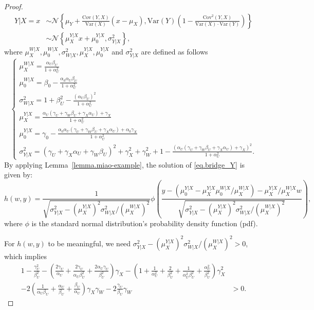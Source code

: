 \documentclass[10pt,a4paper]{amsart}
\def\cN{\mathcal{N}}
\begin{document}
\begin{proof}
$$\begin{aligned}
    Y|X=x&\sim \cN\left\{ \mu_Y+\frac{\mathrm{Cov}(Y,X)}{\mathrm{Var}(X)}(x-\mu_{X}),\mathrm{Var}(Y)\left( 1-\frac{\mathrm{Cov}^2(Y,X)}{\mathrm{Var}(X)\cdot \mathrm{Var}(Y)} \right) \right\}\nonumber \\
	&\sim \cN\left\{ \mu_{X}^{Y|X}x+\mu_{0}^{Y|X},\sigma_{Y|X}^{2} \right\},
\end{aligned}
$$
where $\mu_{X}^{W|X},\mu_{0}^{W|X},\sigma_{W|X}^{2}, \mu_{X}^{Y|X}, \mu_{0}^{Y|X}$ and $\sigma_{Y|X}^{2}$ are defined as follows
$$
\begin{cases}
	\mu_{X}^{W|X}=\frac{\alpha_U\beta_{U}}{1+\alpha_U^{2}}\\
	\mu_{0}^{W|X}=\beta_0-\frac{\alpha_0\alpha_U\beta_{U}}{1+\alpha_U^{2}}\\
	\sigma_{W|X}^{2}=1+\beta_{U}^{2}-\frac{(\alpha_U\beta_{U})^2}{1+\alpha_U^{2}}\\
	\mu_{X}^{Y|X}=\frac{\alpha_U\left( \gamma_{U}+\gamma_W\beta_{U}+\gamma_X\alpha_U \right) +\gamma_X}{1+\alpha_U^{2}}\\
	\mu_{0}^{Y|X}=\gamma_0-\frac{\alpha_0\alpha_U\left( \gamma_{U}+\gamma_W\beta_{U}+\gamma_X\alpha_U \right) +\alpha_0\gamma_X}{1+\alpha_U^{2}}\\
	\sigma_{Y|X}^{2}=(\gamma_{U}+\gamma_X\alpha_U+\gamma_W\beta_{U})^2+\gamma_X^{2}+\gamma_W^{2}+1-\frac{(\alpha_U\left( \gamma_{U}+\gamma_W\beta_{U}+\gamma_X\alpha_U \right) +\gamma_X)^2}{1+\alpha_U^{2}}.
\end{cases}
$$
By applying Lemma~\ref{lemma.miao-example}, the solution of \eqref{eq.bridge_Y} is given by:
$$
h(w,y)=\frac{1}{\sqrt{\sigma_{Y|X}^{2}-\left(\mu_{X}^{Y|X}\right)^2\sigma_{W|X}^{2}/\left(\mu_{X}^{W|X}\right)^2}}\phi \left( \frac{y-\left( \mu_{0}^{Y|X}-\mu_{X}^{Y|X}\mu_{0}^{W|X}/\mu_{X}^{W|X} \right) -\mu_{X}^{Y|X}/\mu_{X}^{W|X}w}{\sqrt{\sigma_{Y|X}^{2}-\left(\mu_{X}^{Y|X}\right)^2\sigma_{W|X}^{2}/\left(\mu_{X}^{W|X}\right)^2}} \right),
$$
where $\phi$ is the standard normal distribution's probability density function (pdf).

For $h(w, y)$ to be meaningful, we need $\sigma_{Y|X}^{2}-\left(\mu_{X}^{Y|X}\right)^2\sigma_{W|X}^{2}/\left(\mu_{X}^{W|X}\right)^2>0$, which implies
\begin{equation}\label{eq. solution_h_exist}
\begin{aligned}
	1-\frac{\gamma_{U}^{2}}{\beta_{U}^{2}}-\left( \frac{2\gamma_{U}}{\alpha_U}+\frac{2\gamma_{U}}{\alpha_U\beta_{U}^{2}}+\frac{2\alpha_U\gamma_{U}}{\beta_{U}^{2}} \right) \gamma_X-\left( 1+\frac{1}{\alpha_U^{2}}+\frac{2}{\beta_{U}^{2}}+\frac{1}{\alpha_U^{2}\beta_{U}^{2}}+\frac{\alpha_U^{2}}{\beta_{U}^{2}} \right) \gamma_X^{2}\\
	-2\left( \frac{1}{\alpha_U\beta_{U}}+\frac{\alpha_U}{\beta_{U}}+\frac{\beta_{U}}{\alpha_U} \right) \gamma_X\gamma_W-2\frac{\gamma_{U}}{\beta_{U}}\gamma_W&>0.
\end{aligned}
\end{equation}


\end{proof}
\end{document}
